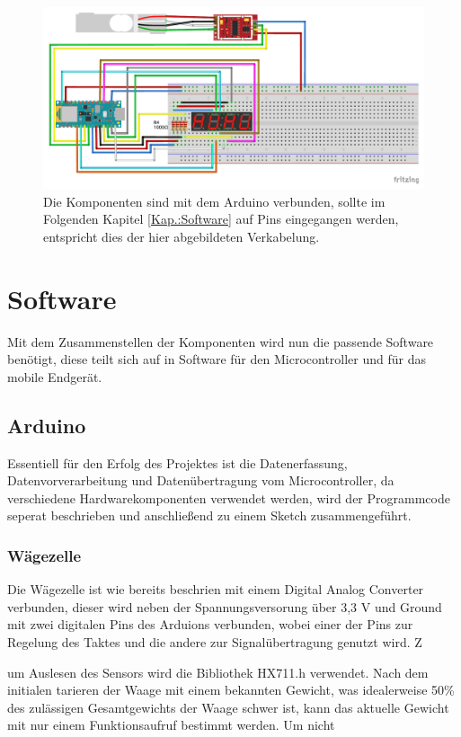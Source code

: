 \begin{figure}[hbtp]
	\centering
	\includegraphics[width=1\textwidth]{Bilder/Platinenlayout.pdf}
	\caption{Die Komponenten sind mit dem Arduino verbunden, sollte im Folgenden Kapitel \ref{Kap.:Software} auf Pins eingegangen werden, entspricht dies der hier abgebildeten Verkabelung.}
	\label{fig.:Frizzing}
\end{figure} 

\section{Software\label{Kap.:Software}}

Mit dem Zusammenstellen der Komponenten wird nun die passende Software benötigt, diese teilt sich auf in Software für den Microcontroller und für das mobile Endgerät.

\subsection{Arduino}
Essentiell für den Erfolg des Projektes ist die Datenerfassung, Datenvorverarbeitung und Datenübertragung vom Microcontroller, da verschiedene Hardwarekomponenten verwendet werden, wird der Programmcode seperat beschrieben und anschließend zu einem Sketch zusammengeführt. 

\subsubsection{Wägezelle}

Die Wägezelle ist wie bereits beschrien mit einem Digital Analog Converter verbunden, dieser wird neben der Spannungsversorung über 3,3 V und Ground mit zwei digitalen Pins des Arduions verbunden, wobei einer der Pins zur Regelung des Taktes und die andere zur Signalübertragung genutzt wird. Z

um Auslesen des Sensors wird die Bibliothek HX711.h verwendet. 
Nach dem initialen tarieren der Waage mit einem bekannten Gewicht, was idealerweise 50\% des zulässigen Gesamtgewichts der Waage schwer ist, kann das aktuelle Gewicht mit nur einem Funktionsaufruf bestimmt werden. Um nicht 
